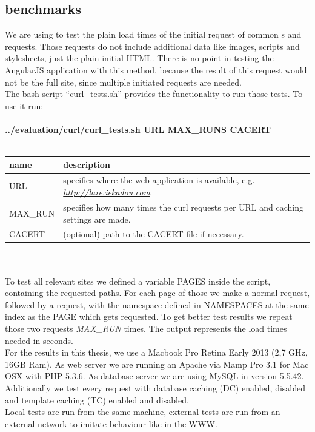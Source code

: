 \subsection{\curl{} benchmarks\label{curl}}
We are using \curl{} to test the plain load times of the initial request of common \httpRequest{}s and \lare{} requests.
Those \curl{} requests do not include additional data like images, scripts and stylesheets, just the plain initial HTML.
There is no point in testing the AngularJS application with this method, because the result of this request would not be the full site, since multiple \ajax{} initiated requests are needed.
\\
The bash script \enquote{curl\_tests.sh} provides the functionality to run those \curl{} tests.
To use it run:
\\
\\
\large{\textbf{{../evaluation/curl/curl\_tests.sh URL MAX\_RUNS CACERT}}}
\\
\\
\begin{tabular}{|p{4cm}|p{9cm}|}
    \hline
    \textbf{name} & \textbf{description} \\
    \hline
    URL & specifies where the web application is available, e.g. \emph{\url{http://lare.iekadou.com}} \\
    \hline
    MAX\_RUN & specifies how many times the curl requests per URL and caching settings are made. \\
    \hline
    CACERT & (optional) path to the CACERT file if necessary. \\
    \hline
\end{tabular}
\\
\\
\noindent{}To test all relevant sites we defined a variable PAGES inside the script, containing the requested paths.
For each page of those we make a normal request, followed by a \lare{} request, with the namespace defined in NAMESPACES at the same index as the PAGE which gets requested.
To get better test results we repeat those two requests \emph{MAX\_RUN} times. The output represents the load times needed in seconds.
\\
For the results in this thesis, we use a Macbook Pro Retina Early 2013 (2,7 GHz, 16GB Ram).
As web server we are running an Apache via Mamp Pro 3.1 for Mac OSX with PHP 5.3.6.
As database server we are using MySQL in version 5.5.42.
\\
Additionally we test every request with database caching (DC) enabled, disabled and template caching (TC) enabled and disabled.
\\
Local tests are run from the same machine, external tests are run from an external network to imitate behaviour like in the WWW.

